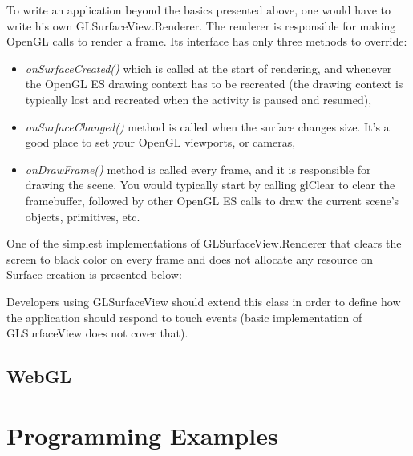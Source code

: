 \documentclass[a4paper,11pt]{article}
\renewenvironment{abstract}
{\itshape \small
  \begin{center}
  \bfseries \abstractname\vspace{-.5em}\vspace{0pt}
  \end{center}
  \list{}{
    \setlength{\leftmargin}{1.5cm}%
    \setlength{\rightmargin}{\leftmargin}%
  }%
  \item\relax}
{\endlist}
\begin{document}
\begin{abstract}


To write an application beyond the basics presented above, one would have to write his own GLSurfaceView.Renderer. The renderer is responsible for making OpenGL calls to render a frame.
Its interface has only three methods to override:

\begin{itemize}
\item \emph{onSurfaceCreated()} which is called at the start of rendering, and whenever the OpenGL ES drawing context has to be recreated (the drawing context is typically lost and recreated when the activity is paused and resumed),
\item \emph{onSurfaceChanged()} method is called when the surface changes size. It's a good place to set your OpenGL viewports, or cameras,
\item \emph{onDrawFrame()} method is called every frame, and it is responsible for drawing the scene. You would typically start by calling glClear to clear the framebuffer, followed by other OpenGL ES calls to draw the current scene's objects, primitives, etc.
\end{itemize}

One of the simplest implementations of GLSurfaceView.Renderer that clears the screen to black color on every frame and does not allocate any resource on Surface creation is presented below:



Developers using GLSurfaceView should extend this class in order to define how the application should respond to touch events (basic implementation of GLSurfaceView does not cover that). 
\newline 




\pagebreak[3] 
\subsection{WebGL}


\clearpage 
\section{Programming Examples} 


\end{abstract}
\end{document}
